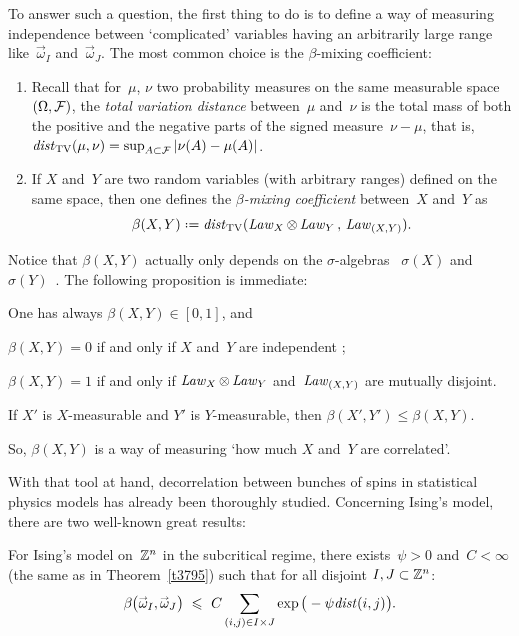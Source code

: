 To answer such a question, the first thing to do is to define a way of measuring independence
between `complicated' variables having an arbitrarily large range
like~$\vec\omega_I$ and~$\vec\omega_J$.
The most common choice is the $\beta$-mixing coefficient:
%
\begin{Def}\label{def3167}\strut
\begin{enumerate}
\item Recall that for~$\mu$, $\nu$ two probability measures
on the same measurable space $(\Omega,\mathcal{F})$,
the \emph{total variation distance} between~$\mu$ and~$\nu$ is
the total mass of both the positive and the negative parts of the signed measure~$\nu-\mu$, that is,
$\mathit{dist}_{\mathrm{TV}}(\mu,\nu) = \sup_{A\subset\mathcal{F}} | \nu(A) - \mu(A) |$.
\item If $X$ and~$Y$ are two random variables (with arbitrary ranges)
defined on the same space, then one defines the \emph{$\beta$-mixing coefficient}
between~$X$ and~$Y$ as
\[ \beta(X,Y) \coloneqq \dist_{\mathrm{TV}} ( \Law_X\otimes\Law_Y\,,\,\Law_{(X,Y)} ) .\]
\end{enumerate}
\end{Def}
%
Notice that $\beta(X,Y)$ actually only depends on the $\sigma$-algebras%
~$\sigma(X)$ and~$\sigma(Y)$~\cite[Formula~(1.5)]{Bradley-review}.
The following proposition is immediate:
%
\begin{Pro}\label{pr7428}\strut
\begin{ienumerate}
\item One has always $\beta(X,Y) \in [0,1]$, and
\item $\beta(X,Y) = 0$ if and only if $X$ and~$Y$ are independent ;
\item $\beta(X,Y) = 1$ if and only if $\operatorname{\mathit{Law}}_X\otimes\operatorname{\mathit{Law}}_Y$
and~$\operatorname{\mathit{Law}}_{(X,Y)}$ are mutually disjoint.
\item\label{i7428d} If $X'$ is $X$-measurable and $Y'$ is $Y$-measurable,
then $\beta(X',Y') \leq \beta(X,Y)$.
\end{ienumerate}
\end{Pro}
%
So, $\beta(X,Y)$ is a way of measuring `how much $X$ and~$Y$ are correlated'.

With that tool at hand, decorrelation between bunches of spins
in statistical physics models has already been thoroughly studied.
Concerning Ising's model, there are two well-known great results:
%
\begin{Thm}\label{t4774}
For Ising's model on~$\mathbb{Z}^n$ in the subcritical regime,
there exists~$\psi>0$ and~$C<\infty$ (the same as in Theorem~\ref{t3795})
such that for all disjoint $I,J\subset\mathbb{Z}^n$:
\[\label{f7869}
\beta \big( \vec\omega_I , \vec\omega_J \big) \ \leq
\ C \sum_{(i,j)\in I\times J} \exp\big(-\psi \dist(i,j)\big) .\]
\end{Thm}

